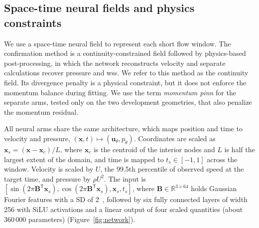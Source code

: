 \documentclass[12pt,a4paper]{article}
\newcommand{\PINN}{\ac{pinn}\xspace}
\newcommand{\WSS}{\ac{wss}\xspace}
\newcommand{\SD}{\ac{SD}\xspace}
\theoremstyle{definition}
\numberwithin{equation}{section}
\begin{document}
\subsection{Space-time neural fields and physics constraints}
\label{sec:field}
We use a space-time neural field to represent each short flow window. The confirmation method is a continuity-constrained field followed by physics-based post-processing, in which the network reconstructs velocity and separate calculations recover pressure and \WSS. We refer to this method as the continuity field. Its divergence penalty is a physical constraint, but it does not enforce the momentum balance during fitting. We use the term \emph{momentum \PINN} for the separate arms, tested only on the two development geometries, that also penalize the momentum residual. 

All neural arms share the same architecture, which maps position and time to velocity and pressure, $(\mathbf x,t)\mapsto(\mathbf u_\theta,p_\theta)$. Coordinates are scaled as $\mathbf x_s=(\mathbf x-\mathbf x_c)/L$, where $\mathbf x_c$ is the centroid of the interior nodes and $L$ is half the largest extent of the domain, and time is mapped to $t_s\in[-1,1]$ across the window. Velocity is scaled by $U$, the 99.5th percentile of observed speed at the target time, and pressure by $\rho U^2$. The input is $[\sin(2\pi\mathbf B^{\mathsf T}\mathbf x_s),\cos(2\pi\mathbf B^{\mathsf T}\mathbf x_s),\mathbf x_s,t_s]$, where $\mathbf B\in\mathbb R^{3\times64}$ holds Gaussian Fourier features with a \SD of 2~\cite{tancik2020fourier}, followed by six fully connected layers of width 256 with SiLU activations and a linear output of four scaled quantities (about 360\,000 parameters) (Figure~\ref{fig:network}).
\end{document}

